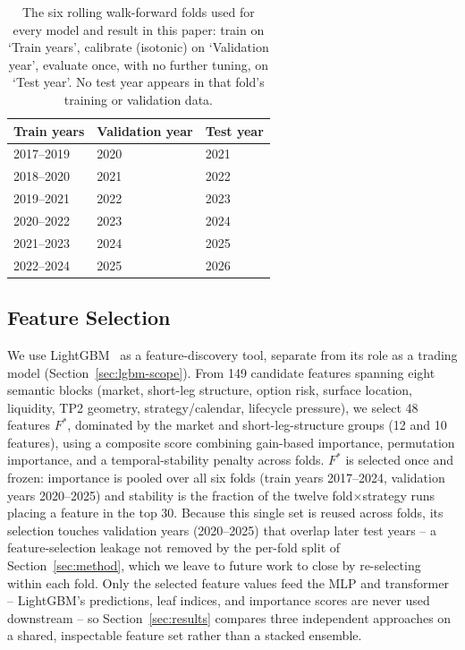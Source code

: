 \documentclass[sigconf,review,anonymous]{acmart}
\begin{document}
\begin{table}[H]
\centering
\footnotesize
\begin{tabular}{lll}
\toprule
Train years & Validation year & Test year \\
\midrule
2017--2019 & 2020 & 2021 \\
2018--2020 & 2021 & 2022 \\
2019--2021 & 2022 & 2023 \\
2020--2022 & 2023 & 2024 \\
2021--2023 & 2024 & 2025 \\
2022--2024 & 2025 & 2026 \\
\bottomrule
\end{tabular}
\caption{The six rolling walk-forward folds used for every model and result in this paper: train on `Train years', calibrate (isotonic) on `Validation year', evaluate once, with no further tuning, on `Test year'. No test year appears in that fold's training or validation data.}
\label{tab:folds}
\end{table}

\subsection{Feature Selection}
We use LightGBM~\cite{ke2017lightgbm} as a feature-discovery tool, separate from its role as a trading model (Section~\ref{sec:lgbm-scope}). From 149 candidate features spanning eight semantic blocks (market, short-leg structure, option risk, surface location, liquidity, TP2 geometry, strategy/calendar, lifecycle pressure), we select 48 features $F^{\ast}$, dominated by the market and short-leg-structure groups (12 and 10 features), using a composite score combining gain-based importance, permutation importance, and a temporal-stability penalty across folds. $F^{\ast}$ is selected once and frozen: importance is pooled over all six folds (train years 2017--2024, validation years 2020--2025) and stability is the fraction of the twelve fold$\times$strategy runs placing a feature in the top 30. Because this single set is reused across folds, its selection touches validation years (2020--2025) that overlap later test years -- a feature-selection leakage not removed by the per-fold split of Section~\ref{sec:method}, which we leave to future work to close by re-selecting within each fold. Only the selected feature values feed the MLP and transformer -- LightGBM's predictions, leaf indices, and importance scores are never used downstream -- so Section~\ref{sec:results} compares three independent approaches on a shared, inspectable feature set rather than a stacked ensemble.
\end{document}
